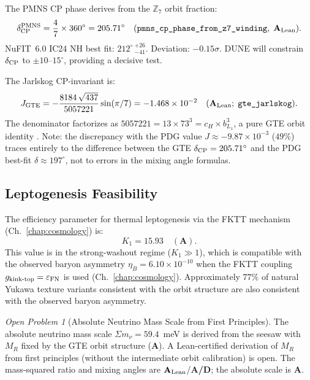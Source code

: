 \documentclass[11pt,openany]{book}
\theoremstyle{remark}
\newtheorem{openprob}{Open Problem}[chapter]
\newcommand{\ZS}{\mathbb{Z}_7}
\newcommand{\lean}[1]{%
  \penalty-100
  \begingroup\def\_{\textunderscore\allowbreak}\texttt{#1}\endgroup}
\newcommand{\CatA}{\textbf{A}}
\newcommand{\CatAL}{\ensuremath{\textbf{A}_{\rm Lean}}}
\newcommand{\CatAD}{\textbf{A/D}}
\begin{document}
The PMNS CP phase derives from the $\ZS$ orbit fraction:
\begin{equation}
  \delta_{\rm CP}^{\rm PMNS} = \frac{4}{7}\times 360^\circ = 205.71^\circ
  \quad (\lean{pmns\_cp\_phase\_from\_z7\_winding},\;\CatAL).
  \label{eq:delta_cp}
\end{equation}
NuFIT~6.0 IC24 NH best fit: $212^\circ\,{}^{+26}_{-41}$.  Deviation: $-0.15\sigma$.
DUNE will constrain $\delta_{\rm CP}$ to $\pm10$--$15^\circ$, providing a decisive test.

The Jarlskog CP-invariant is:
\begin{equation}
  J_{\rm GTE} = -\frac{8184\,\sqrt{437}}{5057221}\sin(\pi/7) = -1.468\times10^{-2}
  \quad (\CatAL;\;\lean{gte\_jarlskog}).
\end{equation}
The denominator factorizes as $5057221 = 13\times73^3 = c_H \times b_{L_1}^3$, a pure
GTE orbit identity \cite{SpivackNeutrino}.  Note: the discrepancy with the PDG value
$J\approx -9.87\times10^{-3}$ ($49\%$) traces entirely to the difference between
the GTE $\delta_{\rm CP} = 205.71^\circ$ and the PDG best-fit $\delta\approx197^\circ$,
not to errors in the mixing angle formulas.

\subsection*{Leptogenesis Feasibility}

The efficiency parameter for thermal leptogenesis via the FKTT mechanism
(Ch.~\ref{chap:cosmology}) is:
\begin{equation}
  K_1 = 15.93
  \quad (\CatA).
  \label{eq:K1}
\end{equation}
This value is in the strong-washout regime ($K_1 \gg 1$), which is compatible with
the observed baryon asymmetry $\eta_B = 6.10\times10^{-10}$ when the FKTT coupling
$g_{\rm kink\text{-}top} = \varepsilon_{\rm FN}$ is used (Ch.~\ref{chap:cosmology}).
Approximately $77\%$ of natural Yukawa texture variants consistent with the orbit
structure are also consistent with the observed baryon asymmetry.

\begin{openprob}[Absolute Neutrino Mass Scale from First Principles]
\label{oprob:nu_mass}
The absolute neutrino mass scale $\Sigma m_\nu = 59.4$~meV is derived from the seesaw
with $M_R$ fixed by the GTE orbit structure (\CatA).  A Lean-certified derivation of
$M_R$ from first principles (without the intermediate orbit calibration) is open.
The mass-squared ratio and mixing angles are \CatAL/\CatAD; the absolute scale
is \CatA.
\end{openprob}
\end{document}
